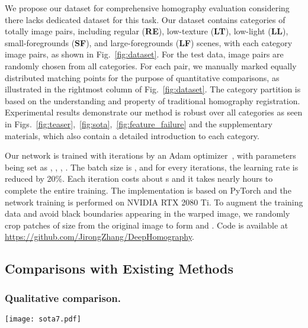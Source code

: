 \documentclass[runningheads]{llncs}
\begin{document}
We propose our dataset for comprehensive homography evaluation considering there lacks dedicated dataset for this task. Our dataset contains  categories of totally  image pairs, including regular (\textbf{RE}), low-texture (\textbf{LT}), low-light (\textbf{LL}), small-foregrounds (\textbf{SF}), and large-foregrounds (\textbf{LF}) scenes, with each category  image pairs, as shown in Fig.~\ref{fig:dataset}.
For the test data,  image pairs are randomly chosen from all categories. For each pair, we manually marked  equally distributed matching points for the purpose of quantitative comparisons, as illustrated in the rightmost column of Fig.~\ref{fig:dataset}. {\color{black}The category partition is based on the understanding and property of traditional homography registration.} Experimental results demonstrate our method is robust over all categories as seen in Figs.~\ref{fig:teaser},~\ref{fig:sota},~\ref{fig:feature_failure} and the supplementary materials, which also contain a detailed introduction to each category. 


Our network is trained with  iterations by an Adam optimizer~\cite{kingma2014adam}, with parameters being set as , , , . The batch size is , and for every  iterations, the learning rate  is reduced by 20\%. Each iteration costs about s and it takes nearly  hours to complete the entire training. The implementation is based on PyTorch and the network training is performed on  NVIDIA RTX 2080 Ti. To augment the training data and avoid black boundaries appearing in the warped image, we randomly crop patches of size  from the original image to form  and . Code is available at \url{https://github.com/JirongZhang/DeepHomography}.\subsection{Comparisons with Existing Methods}\subsubsection{Qualitative comparison.}

\begin{figure*}[p]
  \centering
  \texttt{[image: sota7.pdf]}
\caption{Comparison with existing DNN-based approaches. Column 1 shows the input and GT target images, columns 2 to 4 are results by the supervised~\cite{detone2016deep}, the unsupervised~\cite{nguyen2018unsupervised} and our method. The errors by all the DNN-based methods are displayed by a bar chart at the bottom.
  }\label{fig:sota}
\end{figure*}
\end{document}
